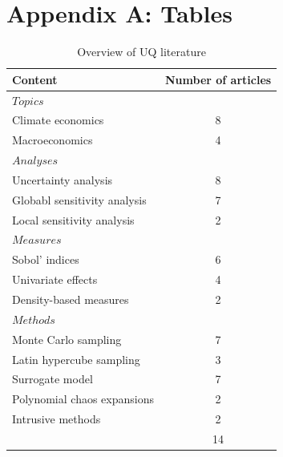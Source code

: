 

\thispagestyle{plain} %

\section*{Appendix A: Tables}
\thispagestyle{plain} %

\phantom{This text will be invisible} 
\hspace{20cm}
\begin{table}[H]
	\centering
	\caption{Overview of UQ literature}
	\label{tab:lit}
	\renewcommand{\arraystretch}{1.2}%
	\begin{tabular}{lc}
		\toprule
		Content                      & Number of articles \\ \midrule
		$Topics$                       &                    \\
		\qquad Climate economics            & 8                  \\
		\qquad Macroeconomics               & 4                 \\ \midrule
		$Analyses$                     &                    \\
		\qquad Uncertainty analysis      & 8                  \\
		\qquad Globabl sensitivity analysis & 7                  \\
		\qquad Local sensitivity analysis   & 2                  \\ \midrule
		$Measures$                     &                    \\
		\qquad Sobol' indices               & 6                  \\
		\qquad Univariate effects           & 4                  \\
		\qquad Density-based measures & 2                  \\ \midrule
		$Methods$                      &                    \\
		\qquad Monte Carlo sampling         & 7                  \\
		\qquad Latin hypercube sampling         & 3                  \\
		\qquad Surrogate model              & 7                  \\
		\qquad Polynomial chaos expansions  & 2                  \\
		\qquad Intrusive methods            & 2                  \\ \midrule
		& 14                 \\ \bottomrule
	\end{tabular}
\end{table}
\noindent

